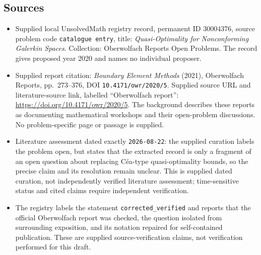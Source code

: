 \documentclass[11pt]{article}
\begin{document}
\subsection{Sources}
\begin{itemize}
\item Supplied local UnsolvedMath registry record, permanent ID \(30004376\), source problem code \texttt{catalogue entry}, title: \emph{Quasi-Optimality for Nonconforming Galerkin Spaces}. Collection: Oberwolfach Reports Open Problems. The record gives proposed year 2020 and names no individual proposer.
\item Supplied report citation: \emph{Boundary Element Methods} (2021), Oberwolfach Reports, pp.\ 273--376, DOI \texttt{10.4171/owr/2020/5}. Supplied source URL and literature-source link, labelled ``Oberwolfach report'': \url{https://doi.org/10.4171/owr/2020/5}. The background describes these reports as documenting mathematical workshops and their open-problem discussions. No problem-specific page or passage is supplied.
\item Literature assessment dated exactly \texttt{2026-08-22}: the supplied curation labels the problem open, but states that the extracted record is only a fragment of an open question about replacing C\'ea-type quasi-optimality bounds, so the precise claim and its resolution remain unclear. This is supplied dated curation, not independently verified literature assessment; time-sensitive status and cited claims require independent verification.
\item The registry labels the statement \texttt{corrected\_verified} and reports that the official Oberwolfach report was checked, the question isolated from surrounding exposition, and its notation repaired for self-contained publication. These are supplied source-verification claims, not verification performed for this draft.
\end{itemize}
\end{document}

